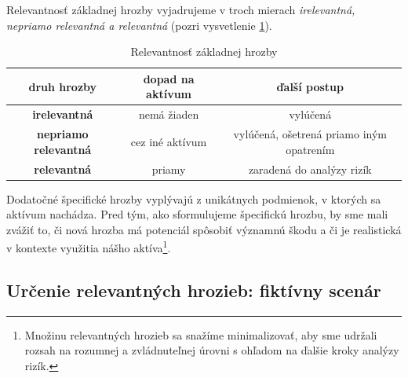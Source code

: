 Relevantnosť základnej hrozby vyjadrujeme v troch mierach \emph{irelevantná, nepriamo relevantná a relevantná} (pozri vysvetlenie \ref{tab:elemthreatrel}).
\begin{table}[h!]
    \caption{Relevantnosť základnej hrozby}
    \label{tab:elemthreatrel}
    \begin{center}
        \begin{tabular}{ |c|c|c| } 
         \hline
         \textbf{druh hrozby} & \textbf{dopad na aktívum} & \textbf{ďalší postup} \\ 
         \hline
         \hline
         \textbf{irelevantná} & nemá žiaden & vylúčená \\ 
         \hline
         \textbf{nepriamo relevantná} & cez iné aktívum & vylúčená, ošetrená priamo iným opatrením  \\ 
         \hline
         \textbf{relevantná} & priamy & zaradená do analýzy rizík \\ 
         \hline
        \end{tabular}
    \end{center}
\end{table}
Dodatočné špecifické hrozby vyplývajú z unikátnych podmienok, v ktorých sa aktívum nachádza. Pred tým, ako sformulujeme špecifickú hrozbu,
by sme mali zvážiť to, či nová hrozba má potenciál spôsobiť významnú škodu a či je realistická v kontexte využitia nášho aktíva\footnote{
Množinu relevantných hrozieb sa snažíme minimalizovať, aby sme udržali rozsah na rozumnej a zvládnuteľnej úrovni s ohľadom na ďalšie kroky
analýzy rizík.}.

\subsection*{Určenie relevantných hrozieb: fiktívny scenár}

